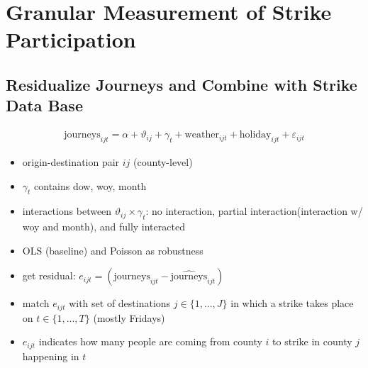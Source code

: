 \clearpage
\section{Granular Measurement of Strike Participation}\label{sec_greta_cons:measurement_strike_participation}


\subsection{Residualize Journeys and Combine with Strike Data Base}
\begin{align}
	\text{journeys}_{ijt} = \alpha + \vartheta_{ij} + \gamma_t + \text{weather}_{ijt} + \text{holiday}_{ijt} + \varepsilon_{ijt} \label{eq_greta_cons:res_journeys}
\end{align}

\begin{itemize}
	\item origin-destination pair $ij$ (county-level)
	\item $\gamma_t$ contains dow, woy, month
	\item interactions between $\vartheta_{ij} \times \gamma_t$: no interaction, partial interaction(interaction w/ woy and month), and fully interacted
	\item OLS (baseline) and Poisson as robustness 
	\item get residual: $e_{ijt} =(\text{journeys}_{ijt} - \widehat{\text{journeys}}_{ijt})$
	\item match $e_{ijt}$ with set of destinations $j\in\{1,...,J\}$ in which a strike takes place on $t\in\{1,...,T\}$ (mostly Fridays)
	\item $e_{ijt}$ indicates how many people are coming from county $i$ to strike in county $j$ happening in $t$
\end{itemize}



